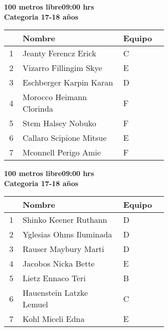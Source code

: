 \begin{minipage}{0.95\linewidth}\vspace{0.5cm} 
\begin{flushleft}
\textbf{
\hspace{-0.15cm}100 metros libre\hspace{1.5cm}09:00 hrs \\Categoria 17-18 años}\vspace{-0.2cm} 
\end{flushleft}
\begin{tabular}{cp{0.63\linewidth}l}
\hline
& \textbf{Nombre} & \textbf{Equipo} \\ \hline
1 & Jeanty Ferencz Erick & C \\ 
2 & Vizarro Fillingim Skye & E \\ 
3 & Eschberger Karpin Karan & D \\ 
4 & Morocco Heimann Clorinda & F \\ 
5 & Stem Halsey Nobuko & F \\ 
6 & Callaro Scipione Mitsue & E \\ 
7 & Mconnell Perigo Amie & F \\ 
\end{tabular}
\end{minipage}
\begin{minipage}{0.95\linewidth}\vspace{0.5cm} 
\begin{flushleft}
\textbf{
\hspace{-0.15cm}100 metros libre\hspace{1.5cm}09:00 hrs \\Categoria 17-18 años}\vspace{-0.2cm} 
\end{flushleft}
\begin{tabular}{cp{0.63\linewidth}l}
\hline
& \textbf{Nombre} & \textbf{Equipo} \\ \hline
1 & Shinko Keener Ruthann & D \\ 
2 & Yglesias Ohms Iluminada & D \\ 
3 & Rauser Maybury Marti & D \\ 
4 & Jacobos Nicka Bette & E \\ 
5 & Lietz Ennaco Teri & B \\ 
6 & Hauenstein Latzke Lemuel & C \\ 
7 & Kohl Miceli Edna & E \\ 
\end{tabular}
\end{minipage}

